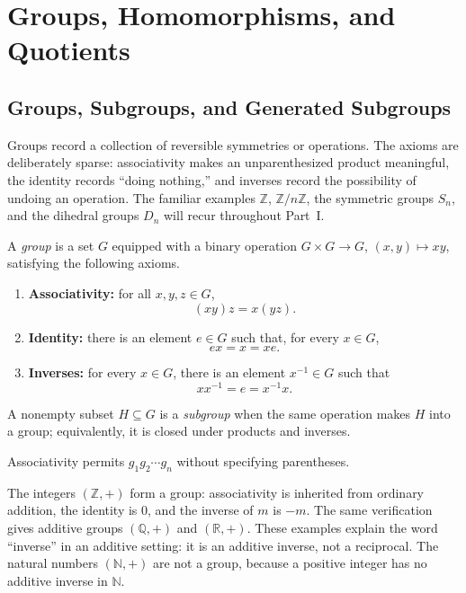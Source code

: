 \chapter{Groups, Homomorphisms, and Quotients}\label{chap:groups-foundations}

\section{Groups, Subgroups, and Generated Subgroups}

Groups record a collection of reversible symmetries or operations.  The
axioms are deliberately sparse: associativity makes an unparenthesized product
meaningful, the identity records ``doing nothing,'' and inverses record the
possibility of undoing an operation.  The familiar examples \(\mathbb Z\),
\(\mathbb Z/n\mathbb Z\), the symmetric groups \(S_n\), and the dihedral groups
\(D_n\) will recur throughout Part~I.

\begin{definition}
A \emph{group} is a set \(G\) equipped with a binary operation
\(G\times G\to G\), \((x,y)\mapsto xy\), satisfying the following axioms.
\begin{enumerate}
\setlength{\itemsep}{7pt}
\item \textbf{Associativity:} for all \(x,y,z\in G\),
      \[(xy)z=x(yz).\]
\item \textbf{Identity:} there is an element \(e\in G\) such that, for every
      \(x\in G\),
      \[ex=x=xe.\]
\item \textbf{Inverses:} for every \(x\in G\), there is an element
      \(x^{-1}\in G\) such that
      \[xx^{-1}=e=x^{-1}x.\]
\end{enumerate}
A nonempty subset \(H\subseteq G\) is a \emph{subgroup} when the same
operation makes \(H\) into a group; equivalently, it is closed under products
and inverses.
\end{definition}

Associativity permits \(g_1g_2\cdots g_n\) without specifying parentheses.

\begin{example}
The integers \((\mathbb Z,+)\) form a group: associativity is inherited from
ordinary addition, the identity is \(0\), and the inverse of \(m\) is \(-m\).
The same verification gives additive groups \((\mathbb Q,+)\) and
\((\mathbb R,+)\).  These examples explain the word ``inverse'' in an additive
setting: it is an additive inverse, not a reciprocal.  The natural numbers
\((\mathbb N,+)\) are not a group, because a positive integer has no additive
inverse in \(\mathbb N\).
\end{example}

